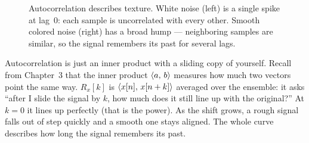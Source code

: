 \begin{figure}[H]
\centering
{}
\caption{Autocorrelation describes texture. White noise (left) is a
single spike at lag~$0$: each sample is uncorrelated with every other. Smooth
colored noise (right) has a broad hump --- neighboring samples are similar, so
the signal remembers its past for several lags.}
\label{ch20:fig-autocorr}
\end{figure}

\begin{happeningbox}
Autocorrelation is just an inner product with a sliding copy of yourself. Recall
from Chapter~3 that the inner product $\langle a,\, b \rangle$ measures how much two
vectors point the same way. $R_x[k]$ is $\langle x[n],\, x[n+k] \rangle$ averaged over the
ensemble: it asks ``after I slide the signal by $k$, how much does it still line
up with the original?'' At $k=0$ it lines up perfectly (that is the power). As
the shift grows, a rough signal falls out of step quickly and a smooth one stays
aligned. The whole curve describes how long the signal remembers its past.
\end{happeningbox}


